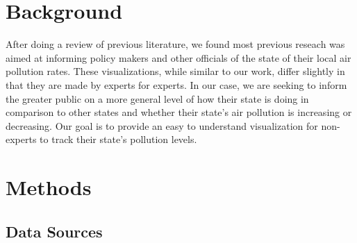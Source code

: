 \documentclass[journal]{vgtc}                %
\begin{document}
\section{Background}
After doing a review of previous literature, we found most previous reseach was aimed at informing policy makers
and other officials of the state of their local air pollution rates. These visualizations, while similar to our work,
differ slightly in that they are made by experts for experts. In our case, we are seeking to inform the greater public
on a more general level of how their state is doing in comparison to other states and whether their state's air pollution
is increasing or decreasing. Our goal is to provide an easy to understand visualization for non-experts to track their
state's pollution levels.

\section{Methods}
\subsection{Data Sources}
\end{document}
